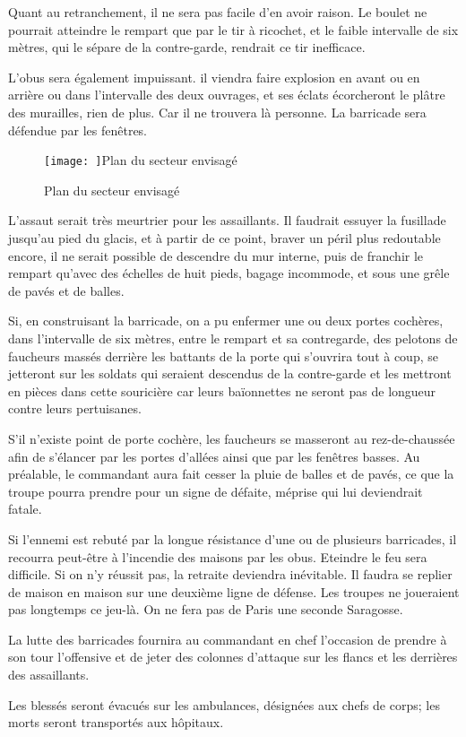 \documentclass[french,twoside]{book} %
\begin{document}
Quant au retranchement, il ne sera pas facile d’en avoir raison. Le boulet ne pourrait atteindre le rempart que par le tir à ricochet, et le faible intervalle de six mètres, qui le sépare de la contre-garde, rendrait ce tir inefficace.\par
L'obus sera également impuissant. il viendra faire explosion en avant ou en arrière ou dans l’intervalle des deux ouvrages, et ses éclats écorcheront le plâtre des murailles, rien de plus. Car il ne trouvera là personne. La barricade sera défendue par les fenêtres.\par
\begin{figure}[htbp]
\noindent\noindent\texttt{[image: ]}Plan du secteur envisagé
\caption{Plan du secteur envisagé}\end{figure}
\noindent L'assaut serait très meurtrier pour les assaillants. Il faudrait essuyer la fusillade jusqu’au pied du glacis, et à partir de ce point, braver un péril plus redoutable encore, il ne serait possible de descendre du mur interne, puis de franchir le rempart qu’avec des échelles de huit pieds, bagage incommode, et sous une grêle de pavés et de balles.\par
Si, en construisant la barricade, on a pu enfermer une ou deux portes cochères, dans l’intervalle de six mètres, entre le rempart et sa contregarde, des pelotons de faucheurs massés derrière les battants de la porte qui s’ouvrira tout à coup, se jetteront sur les soldats qui seraient descendus de la contre-garde et les mettront en pièces dans cette souricière car leurs baïonnettes ne seront pas de longueur contre leurs pertuisanes.\par
S'il n’existe point de porte cochère, les faucheurs se masseront au rez-de-chaussée afin de s’élancer par les portes d’allées ainsi que par les fenêtres basses. Au préalable, le commandant aura fait cesser la pluie de balles et de pavés, ce que la troupe pourra prendre pour un signe de défaite, méprise qui lui deviendrait fatale.\par
Si l’ennemi est rebuté par la longue résistance d’une ou de plusieurs barricades, il recourra peut-être à l’incendie des maisons par les obus. Eteindre le feu sera difficile. Si on n’y réussit pas, la retraite deviendra inévitable. Il faudra se replier de maison en maison sur une deuxième ligne de défense. Les troupes ne joueraient pas longtemps ce jeu-là. On ne fera pas de Paris une seconde Saragosse.\par
La lutte des barricades fournira au commandant en chef l’occasion de prendre à son tour l’offensive et de jeter des colonnes d’attaque sur les flancs et les derrières des assaillants.\par
Les blessés seront évacués sur les ambulances, désignées aux chefs de corps; les morts seront transportés aux hôpitaux.
\end{document}
